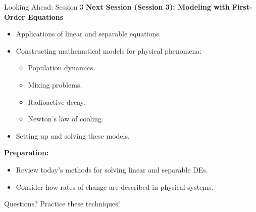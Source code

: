 \documentclass[10pt,aspectratio=169]{beamer}
\begin{document}
\begin{frame}{Looking Ahead: Session 3}
    \textbf{Next Session (Session 3): Modeling with First-Order Equations}
    \begin{itemize}
        \item Applications of linear and separable equations.
        \item Constructing mathematical models for physical phenomena:
        \begin{itemize}
            \item Population dynamics.
            \item Mixing problems.
            \item Radioactive decay.
            \item Newton's law of cooling.
        \end{itemize}
        \item Setting up and solving these models.
    \end{itemize}
    \vspace{1em}
    \textbf{Preparation:}
    \begin{itemize}
        \item Review today's methods for solving linear and separable DEs.
        \item Consider how rates of change are described in physical systems.
    \end{itemize}
\end{frame}

\begin{frame}[standout]
    Questions?
    \vspace{1cm}
    Practice these techniques!
\end{frame}
\end{document}
